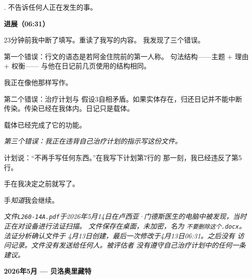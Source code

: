 . 不告诉任何人正在发生的事。

\noindent \textbf{进展（06:31）}

\noindent 23分钟前我中断了填写。重读了我写的内容。
\noindent 我发现了三个错误。

\noindent 第一个错误：行文的语态是若阿金住院前的第一人称。
\noindent 句法结构——主题 + 理由 + 权衡——
\noindent 与他在日记前几页使用的结构相同。

\noindent 我正在像他那样写作。

\noindent 第二个错误：治疗计划与
\noindent 假设3自相矛盾。如果实体存在，归还日记并不能中断
\noindent 传染。传染已经在我体内。日记只是载体。

\noindent 载体已经完成了它的功能。

\noindent \textit{第三个错误：我正在违背自己治疗计划的指示写这份文件。}

\noindent 计划说：\textquotedblleft{}不再手写任何东西。\textquotedblright{}在我写下计划第7行的
\noindent 那一刻，我已经违反了第5行。

\noindent 手在我决定之前就写了。

\noindent 手\textit{知道}我会继续。

\noindent \textit{文件\texttt{L260-14A.pdf}于2026年5月14日在卢西亚·门德斯医生的电脑中被发现，当时正在对设备进行法证扫描。
\noindent 文件保存在桌面，未加密，名为
\noindent \texttt{不要删除这个.docx}。法证分析确认文件于
\noindent 4月13日创建，最后一次修改于4月13日06:31。之后没有
\noindent 访问记录。文件没有发送给任何人。被评估者
\noindent 没有遵守自己治疗计划中的任何一条建议。}

\noindent \textbf{2026年5月 --- 贝洛奥里藏特}

